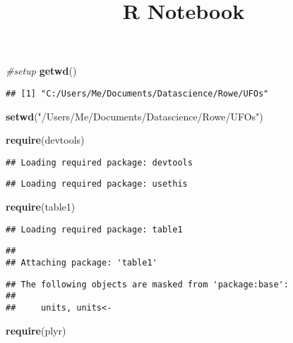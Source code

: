 \documentclass[
]{article}
\title{R Notebook}
\author{}
\date{\vspace{-2.5em}}
\newenvironment{Shaded}{\begin{snugshade}}{\end{snugshade}}
\newcommand{\CommentTok}[1]{\textcolor[rgb]{0.56,0.35,0.01}{\textit{#1}}}
\newcommand{\KeywordTok}[1]{\textcolor[rgb]{0.13,0.29,0.53}{\textbf{#1}}}
\newcommand{\NormalTok}[1]{#1}
\newcommand{\StringTok}[1]{\textcolor[rgb]{0.31,0.60,0.02}{#1}}
\begin{document}
\maketitle

\begin{Shaded}
\begin{Highlighting}[]
\CommentTok{#setup}
\KeywordTok{getwd}\NormalTok{()}
\end{Highlighting}
\end{Shaded}

\begin{verbatim}
## [1] "C:/Users/Me/Documents/Datascience/Rowe/UFOs"
\end{verbatim}

\begin{Shaded}
\begin{Highlighting}[]
\KeywordTok{setwd}\NormalTok{(}\StringTok{"/Users/Me/Documents/Datascience/Rowe/UFOs"}\NormalTok{)}

\KeywordTok{require}\NormalTok{(devtools)}
\end{Highlighting}
\end{Shaded}

\begin{verbatim}
## Loading required package: devtools
\end{verbatim}

\begin{verbatim}
## Loading required package: usethis
\end{verbatim}

\begin{Shaded}
\begin{Highlighting}[]
\KeywordTok{require}\NormalTok{(table1)}
\end{Highlighting}
\end{Shaded}

\begin{verbatim}
## Loading required package: table1
\end{verbatim}

\begin{verbatim}
## 
## Attaching package: 'table1'
\end{verbatim}

\begin{verbatim}
## The following objects are masked from 'package:base':
## 
##     units, units<-
\end{verbatim}

\begin{Shaded}
\begin{Highlighting}[]
\KeywordTok{require}\NormalTok{(plyr)}
\end{Highlighting}
\end{Shaded}
\end{document}
